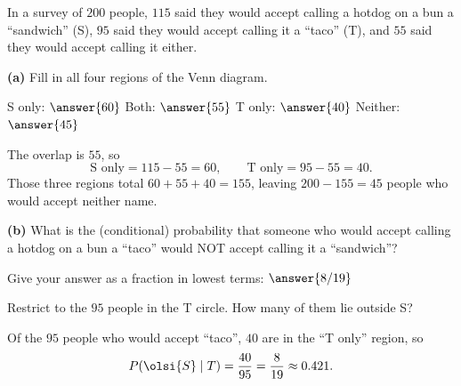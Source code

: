 \documentclass[12pt]{ximera}
\begin{document}
\begin{problem}
In a survey of $200$ people, $115$ said they would accept calling a hotdog on a bun a
``sandwich'' (S), $95$ said they would accept calling it a ``taco'' (T), and $55$ said
they would accept calling it either.

\begin{prompt}
\textbf{(a)} Fill in all four regions of the Venn diagram.

\begin{center}
\end{center}

S only: $\answer{60}$ \qquad
Both: $\answer{55}$ \qquad
T only: $\answer{40}$ \qquad
Neither: $\answer{45}$

\begin{feedback}
The overlap is $55$, so
\[
\text{S only} = 115-55 = 60, \qquad \text{T only} = 95-55 = 40.
\]
Those three regions total $60+55+40=155$, leaving $200-155=45$ people who would
accept neither name.
\end{feedback}
\end{prompt}

\begin{prompt}
\textbf{(b)} What is the (conditional) probability that someone who would accept
calling a hotdog on a bun a ``taco'' would NOT accept calling it a ``sandwich''?

Give your answer as a fraction in lowest terms: $\answer{8/19}$

\begin{hint}
Restrict to the $95$ people in the T circle. How many of them lie outside S?
\end{hint}

\begin{feedback}
Of the $95$ people who would accept ``taco'', $40$ are in the ``T only'' region, so
\[
P\!\left(\olsi{S}\mid T\right)=\frac{40}{95}=\frac{8}{19}\approx 0.421.
\]
\end{feedback}
\end{prompt}
\end{problem}
\end{document}
